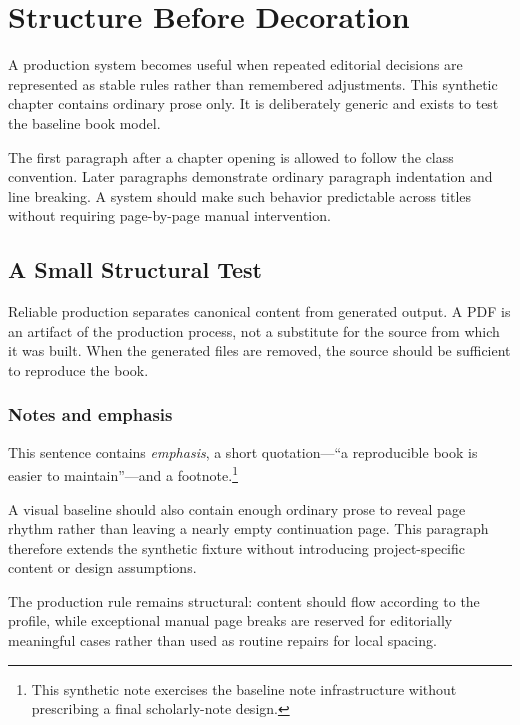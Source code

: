 \chapter{Structure Before Decoration}

A production system becomes useful when repeated editorial decisions are represented as stable rules rather than remembered adjustments. This synthetic chapter contains ordinary prose only. It is deliberately generic and exists to test the baseline book model.

The first paragraph after a chapter opening is allowed to follow the class convention. Later paragraphs demonstrate ordinary paragraph indentation and line breaking. A system should make such behavior predictable across titles without requiring page-by-page manual intervention.

\section{A Small Structural Test}

Reliable production separates canonical content from generated output. A PDF is an artifact of the production process, not a substitute for the source from which it was built. When the generated files are removed, the source should be sufficient to reproduce the book.

\subsection{Notes and emphasis}

This sentence contains \emph{emphasis}, a short quotation---``a reproducible book is easier to maintain''---and a footnote.\footnote{This synthetic note exercises the baseline note infrastructure without prescribing a final scholarly-note design.}

A visual baseline should also contain enough ordinary prose to reveal page rhythm rather than leaving a nearly empty continuation page. This paragraph therefore extends the synthetic fixture without introducing project-specific content or design assumptions.

The production rule remains structural: content should flow according to the profile, while exceptional manual page breaks are reserved for editorially meaningful cases rather than used as routine repairs for local spacing.
